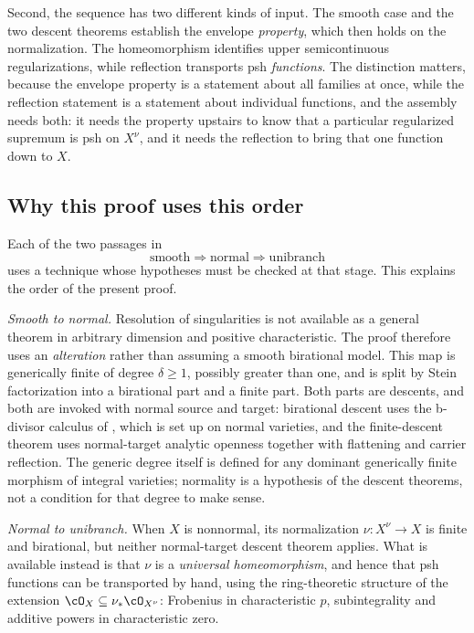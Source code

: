 Second, the sequence has two different kinds of input.  The smooth case and
the two descent theorems establish the envelope \emph{property}, which then
holds on the normalization.  The homeomorphism identifies upper
semicontinuous regularizations, while reflection transports psh
\emph{functions}.  The distinction matters, because
the envelope property is a statement about all families at once, while the
reflection statement is a statement about individual functions, and the
assembly needs both: it needs the property upstairs to know that a
particular regularized supremum is psh on $X^\nu$, and it needs the
reflection to bring that one function down to $X$.

\subsection{Why this proof uses this order}
\label{sec:ch45-order}

Each of the two passages in
\[
 \text{smooth}\Longrightarrow\text{normal}\Longrightarrow\text{unibranch}
\]
uses a technique whose hypotheses must be checked at that stage.  This
explains the order of the present proof.

\emph{Smooth to normal.}  Resolution of singularities is not available as a
general theorem in arbitrary dimension and positive characteristic.
The proof therefore uses an \emph{alteration} rather than assuming a
smooth birational model.  This map is
generically finite of degree $\delta\ge1$, possibly greater than one, and
is split by Stein factorization into a birational part and a finite part.
Both parts are descents, and both
are invoked with normal source and target: birational descent uses the
b-divisor calculus of , which is set up
on normal varieties, and the finite-descent theorem uses normal-target
analytic openness together with flattening and carrier reflection.
The generic degree itself is defined for any dominant generically finite
morphism of integral varieties; normality is a hypothesis of the descent
theorems, not a condition for that degree to make sense.

\emph{Normal to unibranch.}  When $X$ is nonnormal, its normalization
$\nu:X^\nu\to X$ is finite and birational, but neither normal-target
descent theorem applies.  What is available instead
is that $\nu$ is a \emph{universal homeomorphism}, and hence that psh
functions can be transported by hand, using the ring-theoretic structure of
the extension $\cO_X\subseteq\nu_*\cO_{X^\nu}$: Frobenius in characteristic
$p$, subintegrality and additive powers in characteristic zero.

